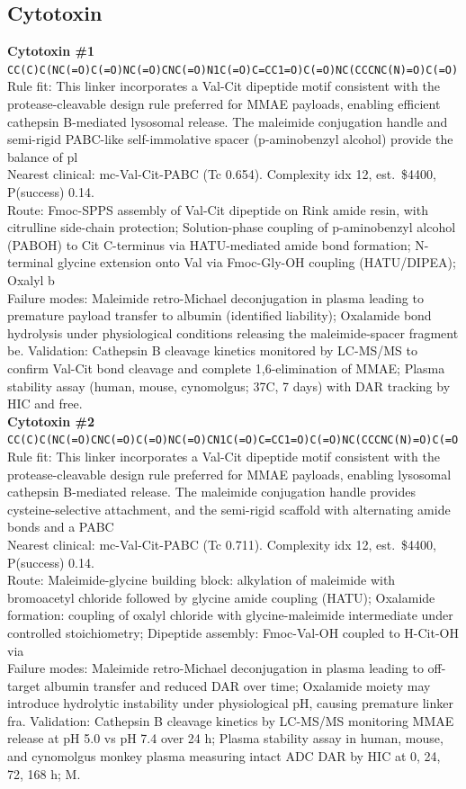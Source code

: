 \documentclass[10pt]{article}
\begin{document}
\subsection{Cytotoxin}
\noindent\textbf{Cytotoxin \#1} \\ \texttt{CC(C)C(NC(=O)C(=O)NC(=O)CNC(=O)N1C(=O)C=CC1=O)C(=O)NC(CCCNC(N)=O)C(=O)} \\ Rule fit: This linker incorporates a Val-Cit dipeptide motif consistent with the protease-cleavable design rule preferred for MMAE payloads, enabling efficient cathepsin B-mediated lysosomal release. The maleimide conjugation handle and semi-rigid PABC-like self-immolative spacer (p-aminobenzyl alcohol) provide the balance of pl \\ Nearest clinical: mc-Val-Cit-PABC (Tc 0.654). Complexity idx 12, est.\ \$4400, P(success) 0.14. \\ Route: Fmoc-SPPS assembly of Val-Cit dipeptide on Rink amide resin, with citrulline side-chain protection; Solution-phase coupling of p-aminobenzyl alcohol (PABOH) to Cit C-terminus via HATU-mediated amide bond formation; N-terminal glycine extension onto Val via Fmoc-Gly-OH coupling (HATU/DIPEA); Oxalyl b \\ Failure modes: Maleimide retro-Michael deconjugation in plasma leading to premature payload transfer to albumin (identified liability); Oxalamide bond hydrolysis under physiological conditions releasing the maleimide-spacer fragment be. Validation: Cathepsin B cleavage kinetics monitored by LC-MS/MS to confirm Val-Cit bond cleavage and complete 1,6-elimination of MMAE; Plasma stability assay (human, mouse, cynomolgus; 37\textdegree{}C, 7 days) with DAR tracking by HIC and free. \\[0.4em]
\noindent\textbf{Cytotoxin \#2} \\ \texttt{CC(C)C(NC(=O)CNC(=O)C(=O)NC(=O)CN1C(=O)C=CC1=O)C(=O)NC(CCCNC(N)=O)C(=O} \\ Rule fit: This linker incorporates a Val-Cit dipeptide motif consistent with the protease-cleavable design rule preferred for MMAE payloads, enabling lysosomal cathepsin B-mediated release. The maleimide conjugation handle provides cysteine-selective attachment, and the semi-rigid scaffold with alternating amide bonds and a PABC \\ Nearest clinical: mc-Val-Cit-PABC (Tc 0.711). Complexity idx 12, est.\ \$4400, P(success) 0.14. \\ Route: Maleimide-glycine building block: alkylation of maleimide with bromoacetyl chloride followed by glycine amide coupling (HATU); Oxalamide formation: coupling of oxalyl chloride with glycine-maleimide intermediate under controlled stoichiometry; Dipeptide assembly: Fmoc-Val-OH coupled to H-Cit-OH via  \\ Failure modes: Maleimide retro-Michael deconjugation in plasma leading to off-target albumin transfer and reduced DAR over time; Oxalamide moiety may introduce hydrolytic instability under physiological pH, causing premature linker fra. Validation: Cathepsin B cleavage kinetics by LC-MS/MS monitoring MMAE release at pH 5.0 vs pH 7.4 over 24 h; Plasma stability assay in human, mouse, and cynomolgus monkey plasma measuring intact ADC DAR by HIC at 0, 24, 72, 168 h; M. \\[0.4em]
\end{document}
